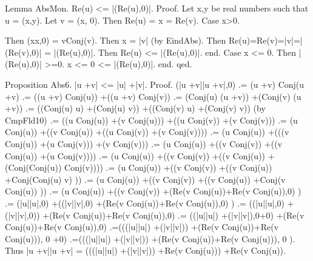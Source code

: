 \documentclass{article}
\newenvironment{forthel}{\begin{leftbar}}{\end{leftbar}}
\newcommand{\cmul}{\cdot}
\newcommand{\rmul}{\cdot}
\newcommand{\cadd}{+}
\newcommand{\radd}{+}
\begin{document}
\begin{forthel}
Lemma AbsMon. Re(u) <= |(Re(u),0)|.
Proof.
	Let x,y be real numbers such that u = (x,y).
	Let v = (x, 0).
	Then Re(u) = x = Re(v).
	Case x>0.
		
		Then (x\rmul x,0) = v\cmul Conj(v).
		Then x = |v| (by EindAbs).
		Then Re(u)=Re(v)=|v|=|(Re(v),0)| = |(Re(u),0)|.
		Then Re(u) <= |(Re(u),0)|.
	end.
	Case x <= 0.
		Then |(Re(u),0)| >=0.
		x <= 0 <= |(Re(u),0)|.
	end.
qed.

Proposition Abs6. |u \cadd  v| <= |u| \radd  |v|.
Proof. (|u \cadd  v|\rmul |u \cadd  v|,0)	.= (u \cadd  v) \cmul  Conj(u \cadd  v)
								.=  ((u \cadd  v) \cmul  Conj(u)) \cadd  ((u \cadd  v) \cmul  Conj(v)) 
								.=  (Conj(u) \cmul  (u \cadd  v)) \cadd  (Conj(v) \cmul  (u \cadd  v)) 
								.=  ((Conj(u) \cmul  u) \cadd  (Conj(u) \cmul  v)) \cadd  ((Conj(v) \cmul  u) \cadd  (Conj(v) \cmul  v)) (by CmpFld10)
								.=  ((u \cmul  Conj(u)) \cadd  (v \cmul  Conj(u))) \cadd  ((u \cmul  Conj(v)) \cadd  (v \cmul  Conj(v)))
								.=  (u \cmul  Conj(u)) \cadd  ((v \cmul  Conj(u)) \cadd  ((u \cmul  Conj(v)) \cadd  (v \cmul  Conj(v))))
								.=  (u \cmul  Conj(u)) \cadd  (((v \cmul  Conj(u)) \cadd  (u \cmul  Conj(v))) \cadd  (v \cmul  Conj(v)))
								.=  (u \cmul  Conj(u)) \cadd  ((v \cmul  Conj(v)) \cadd  ((v \cmul  Conj(u)) \cadd  (u \cmul  Conj(v)))) 
								.=  (u \cmul  Conj(u)) \cadd  ((v \cmul  Conj(v)) \cadd  ((v \cmul  Conj(u)) \cadd  (Conj(Conj(u)) \cmul  Conj(v))))
								.=  (u \cmul  Conj(u)) \cadd  ((v \cmul  Conj(v)) \cadd  ((v \cmul  Conj(u)) \cadd  Conj(Conj(u) \cmul  v) ))
								.=  (u \cmul  Conj(u)) \cadd  ((v \cmul  Conj(v)) \cadd  ((v \cmul  Conj(u)) \cadd  Conj(v \cmul  Conj(u)) ))
								.=  (u \cmul  Conj(u)) \cadd  ((v \cmul  Conj(v)) \cadd  (Re(v \cmul  Conj(u))\radd Re(v \cmul  Conj(u)),0) )
								.=  (|u|\rmul |u|,0) \cadd  ((|v|\rmul |v|,0) \cadd  (Re(v \cmul  Conj(u))\radd Re(v \cmul  Conj(u)),0) )
								.=  ((|u|\rmul |u|,0) \cadd  (|v|\rmul |v|,0)) \cadd  (Re(v \cmul  Conj(u))\radd Re(v \cmul  Conj(u)),0)
								.= ((|u|\rmul |u|) \radd  (|v|\rmul |v|),0\radd 0) \cadd  (Re(v \cmul  Conj(u))\radd Re(v \cmul  Conj(u)),0)
								.=(((|u|\rmul |u|) \radd  (|v|\rmul |v|)) \radd  (Re(v \cmul  Conj(u))\radd Re(v \cmul  Conj(u))), 0 \radd  0)
								.=(((|u|\rmul |u|) \radd  (|v|\rmul |v|)) \radd  (Re(v \cmul  Conj(u))\radd Re(v \cmul  Conj(u))), 0 ).
								Thus |u \cadd  v|\rmul |u \cadd  v| = (((|u|\rmul |u|) \radd  (|v|\rmul |v|)) \radd  Re(v \cmul  Conj(u))) \radd  Re(v \cmul  Conj(u)).


\end{forthel}
\end{document}
